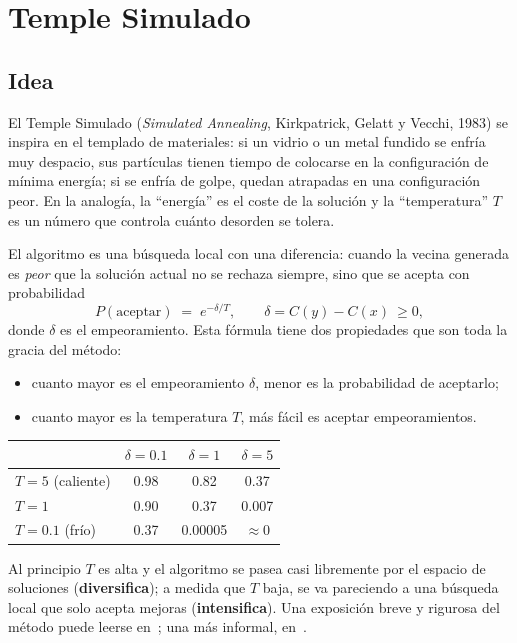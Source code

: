 \section{Temple Simulado}\label{sec:temple}

\subsection{Idea}

El Temple Simulado (\emph{Simulated Annealing}, Kirkpatrick, Gelatt y Vecchi, 1983) se inspira
en el templado de materiales: si un vidrio o un metal fundido se enfría muy despacio, sus
partículas tienen tiempo de colocarse en la configuración de mínima energía; si se enfría de
golpe, quedan atrapadas en una configuración peor. En la analogía, la ``energía'' es el coste
de la solución y la ``temperatura'' $T$ es un número que controla cuánto desorden se tolera.

El algoritmo es una búsqueda local con una diferencia: cuando la vecina generada es
\emph{peor} que la solución actual no se rechaza siempre, sino que se acepta con probabilidad
\[
   P(\text{aceptar}) \;=\; e^{-\delta/T}, \qquad \delta = C(y)-C(x) \ \ge 0 ,
\]
donde $\delta$ es el empeoramiento. Esta fórmula tiene dos propiedades que son toda la gracia
del método:
\begin{itemize}
  \item cuanto mayor es el empeoramiento $\delta$, menor es la probabilidad de aceptarlo;
  \item cuanto mayor es la temperatura $T$, más fácil es aceptar empeoramientos.
\end{itemize}

\begin{center}
\small
\begin{tabular}{@{}lccc@{}}
\toprule
 & $\delta=0.1$ & $\delta=1$ & $\delta=5$ \\ \midrule
$T=5$ (caliente) & 0.98 & 0.82 & 0.37 \\
$T=1$ & 0.90 & 0.37 & 0.007 \\
$T=0.1$ (frío) & 0.37 & 0.00005 & $\approx 0$ \\
\bottomrule
\end{tabular}
\end{center}

Al principio $T$ es alta y el algoritmo se pasea casi libremente por el espacio de soluciones
(\textbf{diversifica}); a medida que $T$ baja, se va pareciendo a una búsqueda local que solo
acepta mejoras (\textbf{intensifica}). Una exposición breve y rigurosa del método puede
leerse en~\cite{bertsimas}; una más informal, en~\cite[cap.~2]{luke}.

